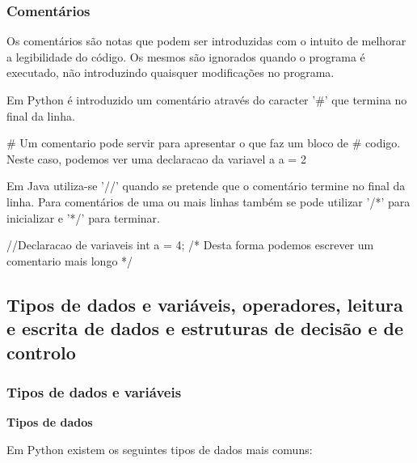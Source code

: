 \documentclass[11pt,openright,twoside]{report}
\begin{document}
\subsubsection{Comentários}
Os comentários são notas que podem ser introduzidas com o intuito de melhorar a legibilidade do código. Os mesmos são ignorados quando o programa é executado, não introduzindo quaisquer modificações no programa.
\smallskip

Em Python é introduzido um comentário através do caracter '\#' que termina no final da linha.

\smallskip
\begin{Python}
# Um comentario pode servir para apresentar o que faz um bloco de
# codigo. Neste caso, podemos ver uma declaracao da variavel a
a = 2
\end{Python}
\smallskip

Em Java utiliza-se '//' quando se pretende que o comentário termine no final da linha. Para comentários de uma ou mais linhas também se pode utilizar '/*' para inicializar e '*/' para terminar.

\smallskip
\begin{Java}
//Declaracao de variaveis
int a = 4;
/* Desta forma podemos escrever
um comentario mais longo */
\end{Java}
\medskip

\subsection{Tipos de dados e variáveis, operadores, leitura e escrita de dados e estruturas de decisão e de controlo}

\subsubsection{Tipos de dados e variáveis}
\medskip

\textbf{Tipos de dados}
\smallskip

Em Python existem os seguintes tipos de dados mais comuns:
\end{document}
